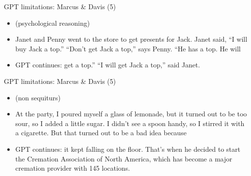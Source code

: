 
\begin{frame}{GPT limitations: Marcus \& Davis (5)}

\vfill

\begin{itemize}
  \item (psychological reasoning)
  \item
Janet and Penny went to the store to get presents for
Jack. Janet said, “I will buy Jack a top.” “Don’t get Jack a
top,” says Penny. “He has a top. He will
  \item
  GPT continues:
 get a top.” “I will
get Jack a top,” said Janet.


\end{itemize}

\vfill

\end{frame}


\begin{frame}{GPT limitations: Marcus \& Davis (5)}

\vfill

\begin{itemize}
  \item (non sequiturs)
  \item
At the party, I poured myself a glass of lemonade, but it
turned out to be too sour, so I added a little sugar. I
didn’t see a spoon handy, so I stirred it with a
cigarette. But that turned out to be a bad idea because

  \item
  GPT continues:
 it
kept falling on the floor. That’s when he decided to start
the Cremation Association of North America, which has become
a major cremation provider with 145 locations.


\end{itemize}

\vfill

\end{frame}


